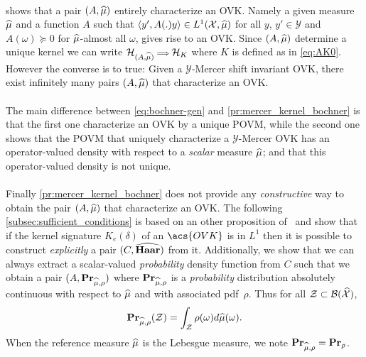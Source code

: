 \paragraph{}
 shows that a pair $(A,\widehat{\mu})$ entirely
characterize an \acs{OVK}. Namely a given measure $\widehat{\mu}$ and a function
$A$ such that $\langle y', A(.)y\rangle\in L^1(\mathcal{X},\widehat{\mu})$ for all $y$,
$y'\in\mathcal{Y}$ and $A(\omega)\succcurlyeq 0$ for $\widehat{\mu}$-almost all
$\omega$, gives rise to an \acs{OVK}. Since $(A,\widehat{\mu})$ determine a unique
kernel we can write
$\mathcal{H}_{(A,\widehat{\mu})}{\scriptstyle\implies}\mathcal{H}_K$ where $K$ is
defined as in \cref{eq:AK0}. However the converse is to true: Given a
$\mathcal{Y}$-Mercer shift invariant \acl{OVK}, there exist infinitely many
pairs $(A,\widehat{\mu})$ that characterize an \acs{OVK}.  \paragraph{}
The main difference between \cref{eq:bochner-gen} and
\cref{pr:mercer_kernel_bochner} is that the first one characterize an \acs{OVK}
by a unique \acf{POVM}, while the second one shows that the \acs{POVM} that
uniquely characterize a $\mathcal{Y}$-Mercer \acs{OVK} has an operator-valued
density with respect to a \emph{scalar} measure $\widehat{\mu}$; and that this
operator-valued density is not unique.
\paragraph{}
Finally \cref{pr:mercer_kernel_bochner} does not provide any
\emph{constructive} way to obtain the pair $(A,\widehat{\mu})$ that characterize
an \acs{OVK}.
The following \cref{subsec:sufficient_conditions} is based on an other
proposition of~\citeauthor{carmeli2006vector} and show that if the kernel
signature $K_e(\delta)$ of an $\acs{OVK}$ is in $L^1$ then it is possible to
construct \emph{explicitly} a pair $(C,\widehat{\mathbf{Haar}})$ from it. Additionally, we
show that we can always extract a scalar-valued \emph{probability} density
function from $C$ such that we obtain a pair
$(A,{\mathbf{{Pr}}}_{\widehat{\mu},\rho})$ where ${\mathbf{{Pr}}}_{\widehat{\mu},\rho}$ is
a \emph{probability} distribution absolutely continuous with respect to
$\widehat{\mu}$ and with associated \ac{pdf}~$\rho$. Thus for all
$\mathcal{Z}\subset\mathcal{B}(\widehat{\mathcal{X}})$,
\begin{dmath*}
    \probability_{\dual{\mu},\rho}(\mathcal{Z})=\int_{\mathcal{Z}}
    \rho(\omega)d\dual{\mu}(\omega).  \end{dmath*}
When the reference measure $\widehat{\mu}$ is the Lebesgue measure, we note
${\mathbf{{Pr}}}_{\widehat{\mu},\rho}={\mathbf{{Pr}}}_\rho$.

